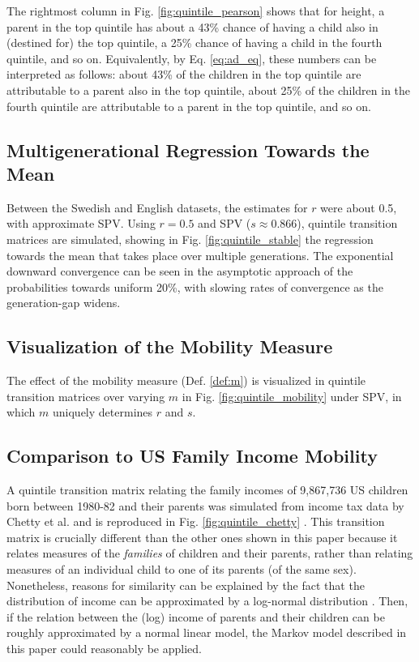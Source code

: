 \documentclass{svproc} %
\begin{document}
The rightmost column in Fig. \ref{fig:quintile_pearson} shows that for height, a parent in the top quintile has about a 43\% chance of having a child also in (destined for) the top quintile, a 25\% chance of having a child in the fourth quintile, and so on. Equivalently, by Eq. \ref{eq:ad_eq}, these numbers can be interpreted as follows: about 43\% of the children in the top quintile are attributable to a parent also in the top quintile, about 25\% of the children in the fourth quintile are attributable to a parent in the top quintile, and so on. 


\subsection{Multigenerational Regression Towards the Mean}

Between the Swedish and English datasets, the estimates for $r$ were about 0.5, with approximate SPV. Using $r = 0.5$ and SPV ($s \approx 0.866$), quintile transition matrices are simulated, showing in Fig. \ref{fig:quintile_stable} the regression towards the mean that takes place over multiple generations. The exponential downward convergence can be seen in the asymptotic approach of the probabilities towards uniform 20\%, with slowing rates of convergence as the generation-gap widens. 


\subsection{Visualization of the Mobility Measure}

The effect of the mobility measure (Def. \ref{def:m}) is visualized in quintile transition matrices over varying $m$ in Fig. \ref{fig:quintile_mobility} under SPV, in which $m$ uniquely determines $r$ and $s$.


\subsection{Comparison to US Family Income Mobility}

A quintile transition matrix relating the family incomes of 9,867,736 US children born between 1980-82 and their parents was simulated from income tax data by Chetty et al. and is reproduced in Fig. \ref{fig:quintile_chetty} \cite{chetty}. This transition matrix is crucially different than the other ones shown in this paper because it relates measures of the \emph{families} of children and their parents, rather than relating measures of an individual child to one of its parents (of the same sex). Nonetheless, reasons for similarity can be explained by the fact that the distribution of income can be approximated by a log-normal distribution \cite{battistin, neal}. Then, if the relation between the (log) income of parents and their children can be roughly approximated by a normal linear model, the Markov model described in this paper could reasonably be applied.
\end{document}
